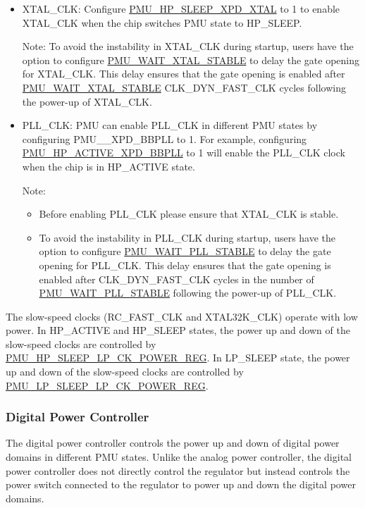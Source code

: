 \documentclass[main\_\_EN.tex]{subfiles}
\begin{document}
\begin{itemize}
    \item XTAL\_CLK: Configure \hyperref[fielddesc:PMUHPSLEEPXPDXTAL]{PMU\_HP\_SLEEP\_XPD\_XTAL} to 1 to enable XTAL\_CLK when the chip switches PMU state to HP\_SLEEP.

    Note: To avoid the instability in XTAL\_CLK during startup, users have the option to configure \hyperref[fielddesc:PMUWAITXTALSTABLE]{PMU\_WAIT\_XTAL\_STABLE} to delay the gate opening for XTAL\_CLK. This delay ensures that the gate opening is enabled after \hyperref[fielddesc:PMUWAITXTALSTABLE]{PMU\_WAIT\_XTAL\_STABLE} CLK\_DYN\_FAST\_CLK cycles following the power-up of XTAL\_CLK.

    \item PLL\_CLK: PMU can enable PLL\_CLK in different PMU states by configuring PMU\_\_XPD\_BBPLL to 1. For example, configuring \hyperref[fielddesc:PMUHPACTIVEXPDBBPLL]{PMU\_HP\_ACTIVE\_XPD\_BBPLL} to 1 will enable the PLL\_CLK clock when the chip is in HP\_ACTIVE state.

    Note:
    \begin{itemize}
        \item Before enabling PLL\_CLK please ensure that XTAL\_CLK is stable.
        \item To avoid the instability in PLL\_CLK during startup, users have the option to configure \hyperref[fielddesc:PMUWAITPLLSTABLE]{PMU\_WAIT\_PLL\_STABLE} to delay the gate opening for PLL\_CLK. This delay ensures that the gate opening is enabled after CLK\_DYN\_FAST\_CLK cycles in the number of \hyperref[fielddesc:PMUWAITPLLSTABLE]{PMU\_WAIT\_PLL\_STABLE} following the power-up of PLL\_CLK.
    \end{itemize}
\end{itemize}

The slow-speed clocks (RC\_FAST\_CLK and XTAL32K\_CLK) operate with low power. In HP\_ACTIVE and HP\_SLEEP states, the power up and down of the slow-speed clocks are controlled by \hyperref[regdesc:PMUHPSLEEPLPCKPOWERREG]{PMU\_HP\_SLEEP\_LP\_CK\_POWER\_REG}. In LP\_SLEEP state, the power up and down of the slow-speed clocks are controlled by \hyperref[regdesc:PMULPSLEEPLPCKPOWERREG]{PMU\_LP\_SLEEP\_LP\_CK\_POWER\_REG}.

\subsubsection{Digital Power Controller}

The digital power controller controls the power up and down of digital power domains in different PMU states. Unlike the analog power controller, the digital power controller does not directly control the regulator but instead controls the power switch connected to the regulator to power up and down the digital power domains.
\end{document}
